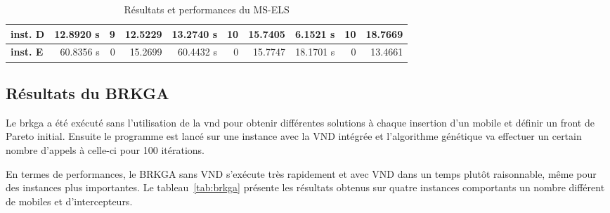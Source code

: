 \begin{table}[H]
\begin{tabular}{l|r|r|r|r|r|r|r|r|r|}
                \multicolumn{1}{|l|}{\textbf{inst. D}} & 12.8920 s                           & 9                                             & 12.5229                                         & 13.2740 s                           & 10                                            & 15.7405                                         & 6.1521 s                            & 10                                            & 18.7669                                         \\ \hline
                \multicolumn{1}{|l|}{\textbf{inst. E}} & 60.8356 s                           & 0                                             & 15.2699                                         & 60.4432 s                           & 0                                             & 15.7747                                         & 18.1701 s                           & 0                                             & 13.4661                                         \\ \hline
                \end{tabular}
                \caption{Résultats et performances du MS-ELS}
                \label{tab:msels}
            \end{table} 

        \subsection{Résultats du BRKGA}
			
			Le \acrlong{brkga} a été exécuté sans l'utilisation de la \acrshort{vnd} pour obtenir différentes solutions à chaque insertion d'un mobile et définir un front de Pareto initial. Ensuite le programme est lancé sur une instance avec la VND intégrée et l'algorithme génétique va effectuer un certain nombre d'appels à celle-ci pour 100 itérations.
			
			En termes de performances, le BRKGA sans VND s'exécute très rapidement et avec VND dans un temps plutôt raisonnable, même pour des instances plus importantes. Le tableau~\ref{tab:brkga} présente les résultats obtenus sur quatre instances comportants un nombre différent de mobiles et d'intercepteurs.
			
